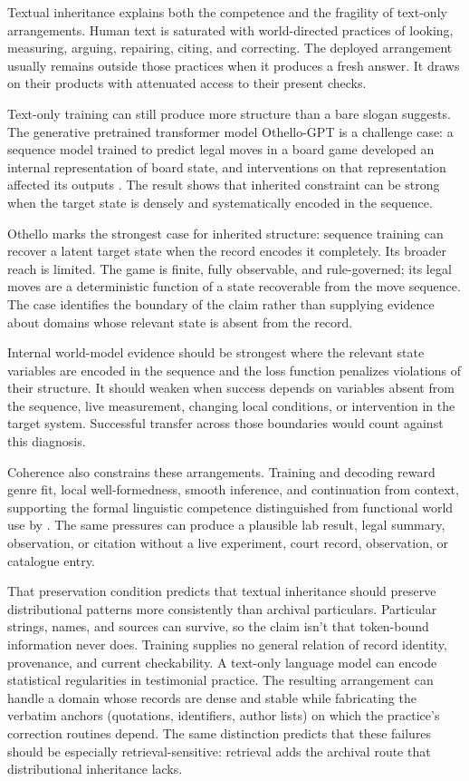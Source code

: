 \documentclass[12pt]{article}
\begin{document}
Textual inheritance explains both the competence and the fragility of text-only arrangements.
Human text is saturated with world-directed practices of looking, measuring, arguing,
repairing, citing, and correcting. The deployed arrangement usually remains outside those
practices when it produces a fresh answer. It draws on their products with attenuated access to
their present checks.

Text-only training can still produce more structure than a bare  slogan suggests. The generative pretrained transformer model Othello-GPT is a
challenge case: a sequence model trained to predict legal moves in a board game
developed an internal representation of board state, and interventions on that
representation affected its outputs \citep{li_etal_2023_emergent_world_representations}.
The result shows that inherited constraint can be strong when the target state is densely and
systematically encoded in the sequence.

Othello marks the strongest case for inherited structure: sequence training can recover a
latent target state when the record encodes it completely. Its broader reach is limited.
The game is finite, fully observable, and rule-governed; its legal moves are a deterministic
function of a state recoverable from the move sequence. The case identifies the
boundary of the claim rather than supplying evidence about domains whose relevant state is
absent from the record.

Internal world-model evidence should be strongest where the relevant
state variables are encoded in the sequence and the loss function penalizes violations
of their structure. It should weaken when success depends on variables absent from the
sequence, live measurement, changing local conditions, or intervention in the target
system. Successful transfer across those boundaries would count against this diagnosis.

Coherence also constrains these arrangements. Training and decoding reward genre fit,
local well-formedness, smooth inference, and continuation from context, supporting the
formal linguistic competence distinguished from functional world use by
\textcite{mahowald2024}. The same pressures can produce a plausible lab result, legal
summary, observation, or citation without a live experiment, court record, observation,
or catalogue entry.

That preservation condition predicts that textual inheritance should preserve
distributional patterns more consistently than archival
particulars. Particular strings, names, and sources can survive, so the claim isn't that
token-bound information never does. Training supplies no general relation of record
identity, provenance, and current checkability. A text-only language model can encode
statistical regularities in testimonial practice.
The resulting arrangement can handle a domain whose records are dense and stable while
fabricating the verbatim anchors (quotations, identifiers, author lists) on which the
practice's correction routines depend. The same distinction predicts that these failures should be especially
retrieval-sensitive: retrieval adds the archival route that distributional inheritance
lacks.
\end{document}
